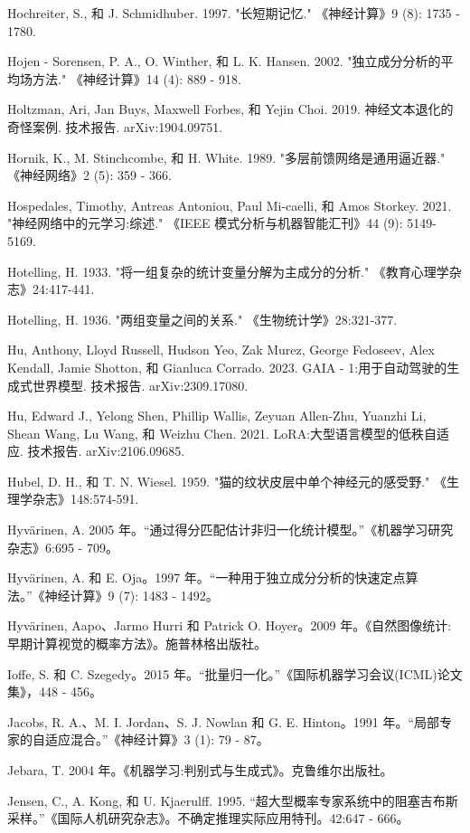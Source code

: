 \documentclass[10pt]{report}
\begin{document}
Hochreiter, S., 和 J. Schmidhuber. 1997. "长短期记忆." 《神经计算》9 (8): 1735 - 1780.

Hojen - Sorensen, P. A., O. Winther, 和 L. K. Hansen. 2002. "独立成分分析的平均场方法." 《神经计算》14 (4): 889 - 918.

Holtzman, Ari, Jan Buys, Maxwell Forbes, 和 Yejin Choi. 2019. 神经文本退化的奇怪案例. 技术报告. arXiv:1904.09751.

Hornik, K., M. Stinchcombe, 和 H. White. 1989. "多层前馈网络是通用逼近器." 《神经网络》2 (5): 359 - 366.

Hospedales, Timothy, Antreas Antoniou, Paul Mi-caelli, 和 Amos Storkey. 2021. "神经网络中的元学习:综述." 《IEEE 模式分析与机器智能汇刊》44 (9): 5149-5169.

Hotelling, H. 1933. "将一组复杂的统计变量分解为主成分的分析." 《教育心理学杂志》24:417-441.

Hotelling, H. 1936. "两组变量之间的关系." 《生物统计学》28:321-377.

Hu, Anthony, Lloyd Russell, Hudson Yeo, Zak Murez, George Fedoseev, Alex Kendall, Jamie Shotton, 和 Gianluca Corrado. 2023. GAIA - 1:用于自动驾驶的生成式世界模型. 技术报告. arXiv:2309.17080.

Hu, Edward J., Yelong Shen, Phillip Wallis, Zeyuan Allen-Zhu, Yuanzhi Li, Shean Wang, Lu Wang, 和 Weizhu Chen. 2021. LoRA:大型语言模型的低秩自适应. 技术报告. arXiv:2106.09685.

Hubel, D. H., 和 T. N. Wiesel. 1959. "猫的纹状皮层中单个神经元的感受野." 《生理学杂志》148:574-591.

Hyvärinen, A. 2005 年。“通过得分匹配估计非归一化统计模型。”《机器学习研究杂志》6:695 - 709。

Hyvärinen, A. 和 E. Oja。1997 年。“一种用于独立成分分析的快速定点算法。”《神经计算》9 (7): 1483 - 1492。

Hyvärinen, Aapo、Jarmo Hurri 和 Patrick O. Hoyer。2009 年。《自然图像统计:早期计算视觉的概率方法》。施普林格出版社。

Ioffe, S. 和 C. Szegedy。2015 年。“批量归一化。”《国际机器学习会议(ICML)论文集》，448 - 456。

Jacobs, R. A.、M. I. Jordan、S. J. Nowlan 和 G. E. Hinton。1991 年。“局部专家的自适应混合。”《神经计算》3 (1): 79 - 87。

Jebara, T. 2004 年。《机器学习:判别式与生成式》。克鲁维尔出版社。

Jensen, C., A. Kong, 和 U. Kjaerulff. 1995. “超大型概率专家系统中的阻塞吉布斯采样。”《国际人机研究杂志》。不确定推理实际应用特刊。42:647 - 666。
\end{document}
